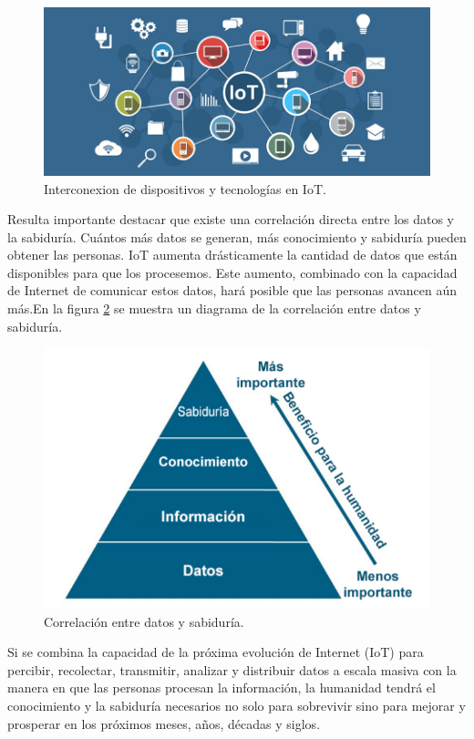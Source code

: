 \begin{figure}[ht]
	\centering
	\includegraphics[width=1\textwidth]{./Figures/iot.png}
	\caption{Interconexion de dispositivos y tecnologías en IoT.}
	\label{fig:Iot}
\end{figure}

Resulta importante destacar que existe una correlación directa entre los datos y la sabiduría. Cuántos más datos se generan, más conocimiento y sabiduría pueden obtener las personas. IoT aumenta drásticamente la cantidad de datos que están disponibles para que los procesemos. Este aumento, combinado con la capacidad de Internet de comunicar estos datos, hará posible que las personas avancen aún más.En la figura \ref{fig:Sabiduria} se muestra un diagrama de la correlación entre datos y sabiduría.

\begin{figure}[ht]
	\centering
	\includegraphics[width=1\textwidth]{./Figures/sabiduria.png}
	\caption{Correlación entre datos y sabiduría.}
	\label{fig:Sabiduria}
\end{figure}

Si se combina la capacidad de la próxima evolución de Internet (IoT) para percibir, recolectar, transmitir, analizar y distribuir datos a escala masiva con la manera en que las personas procesan la información, la humanidad tendrá el conocimiento y la sabiduría necesarios no solo para sobrevivir sino para mejorar y prosperar en los próximos meses, años, décadas y siglos.

